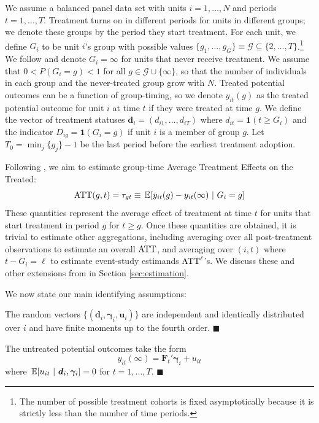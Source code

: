\documentclass[12pt]{article}
\begin{document}
We assume a balanced panel data set with units $i = 1,\dots, N$ and periods $t = 1, \dots, T$. Treatment turns on in different periods for units in different groups; we denote these groups by the period they start treatment. For each unit, we define $G_i$ to be unit $i$'s group with possible values $\{ g_1, \dots, g_G \} \equiv \mathcal{G} \subseteq \{ 2, \dots, T \}$.\footnote{The number of possible treatment cohorts is fixed asymptotically because it is strictly less than the number of time periods.} We follow \citet{Callaway_Santanna_2021} and denote $G_i = \infty$ for units that never receive treatment. We assume that $0 < P(G_i = g) < 1$ for all $g \in \mathcal{G} \cup \{ \infty \}$, so that the number of individuals in each group and the never-treated group grow with $N$. Treated potential outcomes can be a function of group-timing, so we denote $y_{it}(g)$ as the treated potential outcome for unit $i$ at time $t$ if they were treated at time $g$. We define the vector of treatment statuses $\bm d_{i} = (d_{i1},...,d_{iT})$ where $d_{it} = \mathbf{1}(t \geq G_i)$ and the indicator $D_{ig} = \mathbf{1}(G_i = g)$ if unit $i$ is a member of group $g$. Let $T_0 = \min_j \{ g_j \} - 1$ be the last period before the earliest treatment adoption. 

Following \citet{Callaway_Santanna_2021}, we aim to estimate group-time Average Treatment Effects on the Treated:
\begin{equation}
  \ATT(g,t) = \tau_{gt} \equiv \expec{y_{it}(g) - y_{it}(\infty)}{G_i = g} 
\end{equation}
These quantities represent the average effect of treatment at time $t$ for units that start treatment in period $g$ for $t \geq g$. Once these quantities are obtained, it is trivial to estimate other aggregations, including averaging over all post-treatment observations to estimate an overall $\text{ATT}$, and averaging over $(i,t)$ where $t - G_i = \ell$ to estimate event-study estimands $\text{ATT}^\ell$'s. We discuss these and other extensions from \citet{Callaway_Santanna_2021} in Section \ref{sec:estimation}.

We now state our main identifying assumptions:
\begin{assumption}\label{asm:sampling}
The random vectors $\{ (\bm d_i, \bm \gamma_i, \bm u_i) \}$ are independent and identically distributed over $i$ and have finite moments up to the fourth order. $\blacksquare$
\end{assumption}

\begin{assumption}\label{asm:untreated_po}
The untreated potential outcomes take the form
\begin{equation*}
  y_{it}(\infty) = \bm{F}_t' \bm \gamma_i + u_{it}
\end{equation*}
where $\expec{u_{it}}{\bm d_i, \bm \gamma_i} = 0$ for $t = 1,...,T$. $\blacksquare$
\end{assumption}
\end{document}
